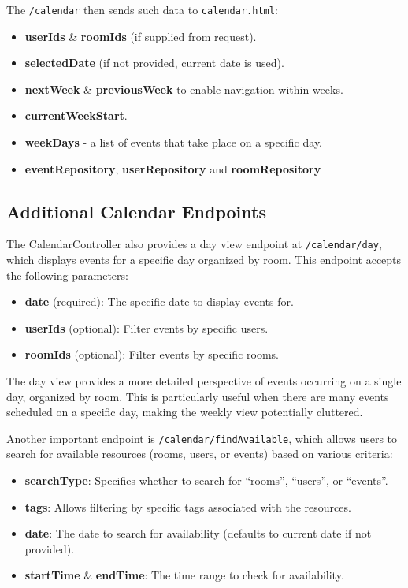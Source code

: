 The \texttt{/calendar} then sends such data to \texttt{calendar.html}:
\begin{itemize}
    \item \textbf{userIds} \& \textbf{roomIds} (if supplied from request).
    \item \textbf{selectedDate} (if not provided, current date is used).
    \item \textbf{nextWeek} \& \textbf{previousWeek} to enable navigation within weeks.
    \item \textbf{currentWeekStart}.
    \item \textbf{weekDays} - a list of events that take place on a specific day.
    \item \textbf{eventRepository}, \textbf{userRepository} and \textbf{roomRepository}
\end{itemize}

\subsection{Additional Calendar Endpoints}\label{subsec:additional-calendar-endpoints}

The CalendarController also provides a day view endpoint at \texttt{/calendar/day}, which displays events for a specific day organized by room.
This endpoint accepts the following parameters:

\begin{itemize}
    \item \textbf{date} (required): The specific date to display events for.
    \item \textbf{userIds} (optional): Filter events by specific users.
    \item \textbf{roomIds} (optional): Filter events by specific rooms.
\end{itemize}

The day view provides a more detailed perspective of events occurring on a single day, organized by room.
This is particularly useful when there are many events scheduled on a specific day, making the weekly view potentially cluttered.

Another important endpoint is \texttt{/calendar/findAvailable}, which allows users to search for available resources (rooms, users, or events) based on various criteria:

\begin{itemize}
    \item \textbf{searchType}: Specifies whether to search for ``rooms'', ``users'', or ``events''.
    \item \textbf{tags}: Allows filtering by specific tags associated with the resources.
    \item \textbf{date}: The date to search for availability (defaults to current date if not provided).
    \item \textbf{startTime} \& \textbf{endTime}: The time range to check for availability.
\end{itemize}


